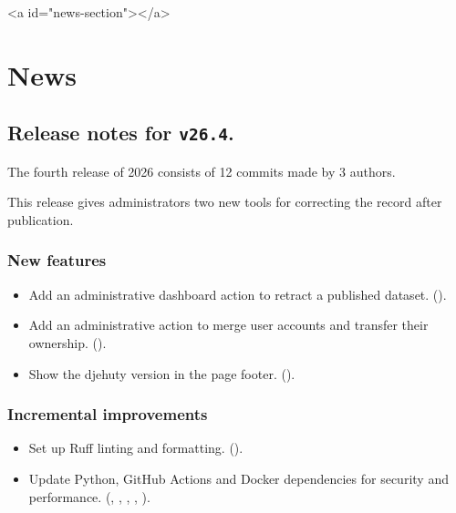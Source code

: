\ifdefined\HCode
\begin{html}
<a id="news-section"></a>
\end{html}
\fi
\chapter*{News}

\section*{Release notes for \texttt{v26.4}.}

  The fourth release of 2026 consists of 12 commits made by 3 authors.

  This release gives administrators two new tools for correcting the record after
publication.

\subsection*{New features}
\begin{itemize}
\item{Add an administrative dashboard action to retract a published dataset.
    ().}
\item{Add an administrative action to merge user accounts and transfer their ownership.
    ().}
\item{Show the djehuty version in the page footer.
    ().}
\end{itemize}

\subsection*{Incremental improvements}
\begin{itemize}
\item{Set up Ruff linting and formatting.
    ().}
\item{Update Python, GitHub Actions and Docker dependencies for security and performance.
    (,
    ,
    ,
    ,
    ).}
\end{itemize}

